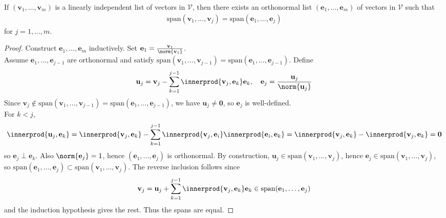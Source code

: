 \begin{theorem} \label{thm:gramschmidtprocedure} If $(\mathbf{v}_1, \ldots, \mathbf{v}_m)$ is a linearly independent list of vectors in $\mathcal{V}$, then there exists an orthonormal list $(\mathbf{e}_1, \ldots, \mathbf{e}_m)$ of vectors in $\mathcal{V}$ such that
\begin{align}
\text{span}(\mathbf{v}_1, \ldots, \mathbf{v}_j) = \text{span}(\mathbf{e}_1, \ldots, \mathbf{e}_j) \nonumber
\end{align}
for $j = 1, \ldots, m$.
\begin{proof} Construct $\mathbf{e}_1, \ldots, \mathbf{e}_m$ inductively. Set $\mathbf{e}_1 = \frac{\mathbf{v}_1}{\norm{\mathbf{v}_1}}$.\\
Assume $\mathbf{e}_1, \ldots, \mathbf{e}_{j-1}$ are orthonormal and satisfy $\text{span}(\mathbf{v}_1, \ldots, \mathbf{v}_{j-1}) = \text{span}(\mathbf{e}_1, \ldots, \mathbf{e}_{j-1})$. Define
\begin{align}
\mathbf{u}_j = \mathbf{v}_j - \sum\limits_{k=1}^{j-1} \innerprod{\mathbf{v}_j, \mathbf{e}_k} \mathbf{e}_k, \ \ \ \mathbf{e}_j = \frac{\mathbf{u}_j}{\norm{\mathbf{u}_j}} \nonumber
\end{align}
Since $\mathbf{v}_j \notin \text{span}(\mathbf{v}_1, \ldots, \mathbf{v}_{j-1}) = \text{span}(\mathbf{e}_1, \ldots, \mathbf{e}_{j-1})$, we have $\mathbf{u}_j \neq \mathbf{0}$, so $\mathbf{e}_j$ is well-defined.\\
For $k<j$,
\begin{align}
\innerprod{\mathbf{u}_j, \mathbf{e}_k} = \innerprod{\mathbf{v}_j, \mathbf{e}_k} - \sum\limits_{k=1}^{j-1} \innerprod{\mathbf{v}_j, \mathbf{e}_i} \innerprod{\mathbf{e}_i, \mathbf{e}_k} = \innerprod{\mathbf{v}_j, \mathbf{e}_k} - \innerprod{\mathbf{v}_j, \mathbf{e}_k} = \mathbf{0} \nonumber
\end{align}
so $\mathbf{e}_j \perp \mathbf{e}_k$. Also $\norm{\mathbf{e}_j} = 1$, hence $(\mathbf{e}_1, \ldots, \mathbf{e}_j)$ is orthonormal. By construction, $\mathbf{u}_j \in \text{span}(\mathbf{v}_1, \ldots, \mathbf{v}_{j})$, hence $\mathbf{e}_j \in \text{span}(\mathbf{v}_1, \ldots, \mathbf{v}_{j})$, so $\text{span}(\mathbf{e}_1, \ldots, \mathbf{e}_{j}) \subset \text{span}(\mathbf{v}_1, \ldots, \mathbf{v}_{j})$. The reverse inclusion follows since
\begin{align}
\mathbf{v}_j = \mathbf{u}_j + \sum\limits_{k=1}^{j-1} \innerprod{\mathbf{v}_j, \mathbf{e}_k} \mathbf{e}_k \in \text{span}(\mathbf{e}_1, \ldots, \mathbf{e}_{j}) \nonumber
\end{align}
and the induction hypothesis gives the rest. Thus the spans are equal.
\end{proof}
\end{theorem}

